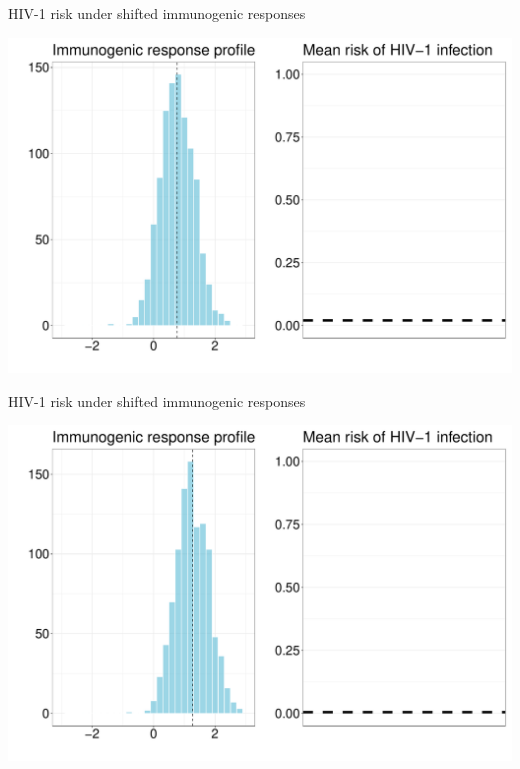 \documentclass{beamer}
\begin{document}

\begin{frame}[c,noframenumbering]{HIV-1 risk under shifted immunogenic responses}

\hspace*{-1cm}\includegraphics[scale=0.4]{shift-7}

\note{
}

\end{frame}


\begin{frame}[c,noframenumbering]{HIV-1 risk under shifted immunogenic responses}

\hspace*{-1cm}\includegraphics[scale=0.4]{shift-8}

\note{
}

\end{frame}
\end{document}
